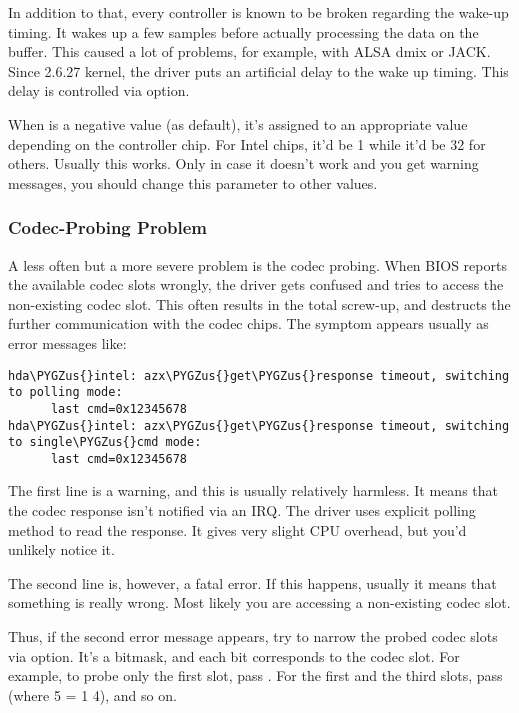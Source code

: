 \documentclass[a4paper,8pt,english]{sphinxmanual}
\def\PYGZus{\char`\_}
\begin{document}
In addition to that, every controller is known to be broken regarding
the wake-up timing.  It wakes up a few samples before actually
processing the data on the buffer.  This caused a lot of problems, for
example, with ALSA dmix or JACK.  Since 2.6.27 kernel, the driver puts
an artificial delay to the wake up timing.  This delay is controlled
via  option.

When  is a negative value (as default), it's assigned to
an appropriate value depending on the controller chip.  For Intel
chips, it'd be 1 while it'd be 32 for others.  Usually this works.
Only in case it doesn't work and you get warning messages, you should
change this parameter to other values.


\subsubsection{Codec-Probing Problem}
\label{sound/hd-audio/notes:codec-probing-problem}
A less often but a more severe problem is the codec probing.  When
BIOS reports the available codec slots wrongly, the driver gets
confused and tries to access the non-existing codec slot.  This often
results in the total screw-up, and destructs the further communication
with the codec chips.  The symptom appears usually as error messages
like:

\begin{Verbatim}[commandchars=\\\{\}]
hda\PYGZus{}intel: azx\PYGZus{}get\PYGZus{}response timeout, switching to polling mode:
      last cmd=0x12345678
hda\PYGZus{}intel: azx\PYGZus{}get\PYGZus{}response timeout, switching to single\PYGZus{}cmd mode:
      last cmd=0x12345678
\end{Verbatim}

The first line is a warning, and this is usually relatively harmless.
It means that the codec response isn't notified via an IRQ.  The
driver uses explicit polling method to read the response.  It gives
very slight CPU overhead, but you'd unlikely notice it.

The second line is, however, a fatal error.  If this happens, usually
it means that something is really wrong.  Most likely you are
accessing a non-existing codec slot.

Thus, if the second error message appears, try to narrow the probed
codec slots via  option.  It's a bitmask, and each bit
corresponds to the codec slot.  For example, to probe only the first
slot, pass .  For the first and the third slots, pass
 (where 5 = 1 \textbar{} 4), and so on.
\end{document}
